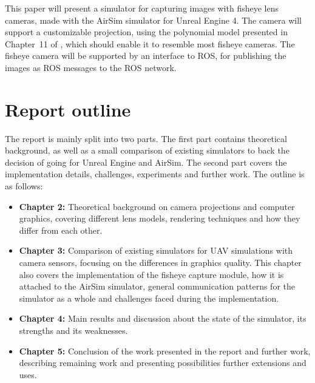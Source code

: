This paper will present a simulator for capturing images with fisheye lens cameras, made with the AirSim simulator for Unreal Engine 4. The camera will support a customizable projection, using the polynomial model presented in Chapter~11 of \cite{FisheyeCorke}, which should enable it to resemble most fisheye cameras. The fisheye camera will be supported by an interface to ROS, for publishing the images as ROS messages to the ROS network.

\section{Report outline}

The report is mainly split into two parts. The first part contains theoretical background, as well as a small comparison of existing simulators to back the decision of going for Unreal Engine and AirSim. The second part covers the implementation details, challenges, experiments and further work. The outline is as follows:

\begin{itemize}
    \item \textbf{Chapter 2:} Theoretical background on camera projections and computer graphics, covering different lens models, rendering techniques and how they differ from each other.
    \item \textbf{Chapter 3:} Comparison of existing simulators for UAV simulations with camera sensors, focusing on the differences in graphics quality. This chapter also covers the implementation of the fisheye capture module, how it is attached to the AirSim simulator, general communication patterns for the simulator as a whole and challenges faced during the implementation.
    \item \textbf{Chapter 4:} Main results and discussion about the state of the simulator, its strengths and its weaknesses.
    \item \textbf{Chapter 5:} Conclusion of the work presented in the report and further work, describing remaining work and presenting possibilities further extensions and uses.
\end{itemize}


